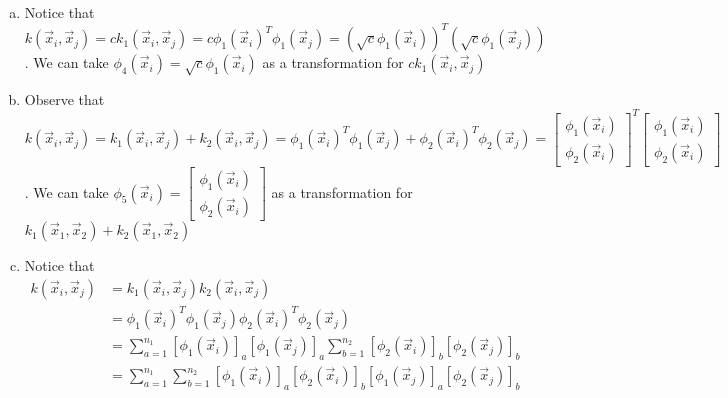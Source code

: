 \documentclass{article}
\begin{document}
    \begin{enumerate}[(a)]
        \item Notice that $k(\vec{x}_i, \vec{x}_j) = c k_1(\vec{x}_i, \vec{x}_j) = c \phi_1(\vec{x}_i)^T \phi_1(\vec{x}_j) = (\sqrt{c}\phi_1(\vec{x}_i))^T(\sqrt{c}\phi_1(\vec{x}_j))$. We can take $\phi_4(\vec{x}_i) = \sqrt{c}\phi_1(\vec{x}_i)$ as a transformation for $ck_1(\vec{x}_i, \vec{x}_j)$
        \item Observe that $k(\vec{x}_i, \vec{x}_j) = k_1(\vec{x}_i, \vec{x}_j) + k_2(\vec{x}_i, \vec{x}_j) = \phi_1(\vec{x}_i)^T \phi_1(\vec{x}_j) + \phi_2(\vec{x}_i)^T \phi_2(\vec{x}_j) = \begin{bmatrix} \phi_1(\vec{x}_i) \\ \phi_2(\vec{x}_i) \end{bmatrix} ^T \begin{bmatrix} \phi_1(\vec{x}_i) \\ \phi_2(\vec{x}_i) \end{bmatrix}$. We can take $\phi_5(\vec{x}_i) = \begin{bmatrix} \phi_1(\vec{x}_i) \\ \phi_2(\vec{x}_i) \end{bmatrix}$ as a transformation for $k_1(\vec{x}_1, \vec{x}_2) + k_2(\vec{x}_1, \vec{x}_2)$
        \item Notice that 
        \begin{align*}
            k(\vec{x}_i, \vec{x}_j) &= k_1(\vec{x}_i, \vec{x}_j) k_2(\vec{x}_i, \vec{x}_j) \\
            & = \phi_1(\vec{x}_i)^T \phi_1(\vec{x}_j)\phi_2(\vec{x}_i)^T \phi_2(\vec{x}_j)
            \\
            & = \sum_{a = 1}^{n_1} [\phi_1(\vec{x}_i)]_a [\phi_1(\vec{x}_j)]_a \sum_{b = 1}^{n_2} [\phi_2(\vec{x}_i)]_b [\phi_2(\vec{x}_j)]_b \\
            &= \sum_{a = 1}^{n_1} \sum_{b = 1}^{n_2} [\phi_1(\vec{x}_i)]_a [\phi_2(\vec{x}_i)]_b [\phi_1(\vec{x}_j)]_a  [\phi_2(\vec{x}_j)]_b
        \end{align*}


\end{enumerate}
\end{document}
